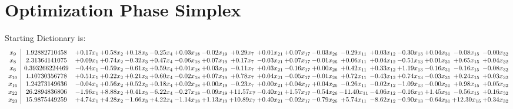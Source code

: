 \documentclass[9pt]{article}
\begin{document}
\section{Optimization Phase Simplex}
Starting Dictionary is:
\[\begin{array}{c| c c@{\hskip 2pt} c@{\hskip 2pt} c@{\hskip 2pt} c@{\hskip 2pt} c@{\hskip 2pt} c@{\hskip 2pt} c@{\hskip 2pt} c@{\hskip 2pt} c@{\hskip 2pt} c@{\hskip 2pt} c@{\hskip 2pt} c@{\hskip 2pt} c@{\hskip 2pt} c@{\hskip 2pt} c@{\hskip 2pt} c@{\hskip 2pt} }
 x_{9}   &  1.92882710458 & +  0.17 x_{1} & +  0.58 x_{2} & +  0.18 x_{3} & -0.25 x_{4} & +  0.03 x_{18} & -0.02 x_{19} & +  0.29 x_{7} & +  0.01 x_{21} & +  0.07 x_{17} & -0.03 x_{26} & -0.29 x_{11} & +  0.03 x_{12} & -0.30 x_{13} & +  0.04 x_{31} & -0.08 x_{15} & -0.00 x_{32}\\
 x_{8}   &  2.31364141075 & +  0.09 x_{1} & +  0.74 x_{2} & -0.32 x_{3} & +  0.47 x_{4} & -0.06 x_{18} & +  0.07 x_{19} & +  0.17 x_{7} & -0.03 x_{21} & +  0.07 x_{17} & -0.01 x_{26} & +  0.06 x_{11} & +  0.04 x_{12} & -0.51 x_{13} & +  0.01 x_{31} & +  0.65 x_{15} & +  0.04 x_{32}\\
 x_{6}   &  0.393266224469 & -0.44 x_{1} & -0.59 x_{2} & -0.61 x_{3} & +  0.59 x_{4} & +  0.01 x_{18} & +  0.03 x_{19} & -0.11 x_{7} & +  0.03 x_{21} & -0.16 x_{17} & +  0.00 x_{26} & +  0.42 x_{11} & +  0.33 x_{12} & +  1.19 x_{13} & -0.16 x_{31} & -0.16 x_{15} & -0.08 x_{32}\\
 x_{10}   &  1.10730356778 & +  0.51 x_{1} & +  0.22 x_{2} & +  0.21 x_{3} & +  0.60 x_{4} & -0.02 x_{18} & +  0.07 x_{19} & +  0.78 x_{7} & +  0.04 x_{21} & -0.05 x_{17} & -0.01 x_{26} & +  0.72 x_{11} & -0.43 x_{12} & +  0.74 x_{13} & -0.03 x_{31} & +  0.24 x_{15} & +  0.03 x_{32}\\
 x_{16}   &  1.24273149636 & -0.04 x_{1} & +  0.56 x_{2} & +  0.52 x_{3} & +  0.18 x_{4} & +  0.02 x_{18} & +  0.00 x_{19} & -0.23 x_{7} & +  0.00 x_{21} & +  0.04 x_{17} & +  0.04 x_{26} & -0.26 x_{11} & -0.02 x_{12} & -1.09 x_{13} & -0.00 x_{31} & +  0.98 x_{15} & +  0.05 x_{32}\\
 x_{22}   &  26.2894836806 & -1.96 x_{1} & +  8.88 x_{2} & +  0.41 x_{3} & -6.22 x_{4} & -0.27 x_{18} & -0.09 x_{19} & + 11.57 x_{7} & -0.40 x_{21} & +  1.57 x_{17} & -0.54 x_{26} & -11.40 x_{11} & -4.06 x_{12} & -0.16 x_{13} & +  1.45 x_{31} & -0.56 x_{15} & +  0.16 x_{32}\\
 x_{23}   &  15.9875449259 & +  4.74 x_{1} & +  4.28 x_{2} & -1.66 x_{3} & +  4.22 x_{4} & -1.14 x_{18} & +  1.13 x_{19} & + 10.89 x_{7} & +  0.40 x_{21} & -0.02 x_{17} & -0.79 x_{26} & +  5.74 x_{11} & -8.62 x_{12} & -0.90 x_{13} & -0.64 x_{31} & + 12.30 x_{15} & +  0.34 x_{32}\\

\end{array}\]
\end{document}
